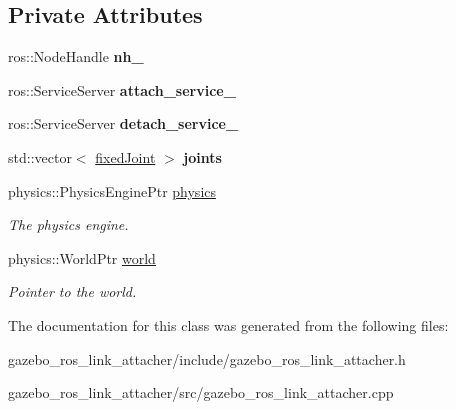 \subsection*{Private Attributes}
\begin{DoxyCompactItemize}
\item 
ros\+::\+Node\+Handle {\bfseries nh\+\_\+}\hypertarget{classgazebo_1_1GazeboRosLinkAttacher_aa9f2e548b0d54e7654f5d695465c35d8}{}\label{classgazebo_1_1GazeboRosLinkAttacher_aa9f2e548b0d54e7654f5d695465c35d8}

\item 
ros\+::\+Service\+Server {\bfseries attach\+\_\+service\+\_\+}\hypertarget{classgazebo_1_1GazeboRosLinkAttacher_a0ad42302b9f911db4c4ee4575da1b21b}{}\label{classgazebo_1_1GazeboRosLinkAttacher_a0ad42302b9f911db4c4ee4575da1b21b}

\item 
ros\+::\+Service\+Server {\bfseries detach\+\_\+service\+\_\+}\hypertarget{classgazebo_1_1GazeboRosLinkAttacher_ac367ec2e6d4586a0b0012691c1eb9b9e}{}\label{classgazebo_1_1GazeboRosLinkAttacher_ac367ec2e6d4586a0b0012691c1eb9b9e}

\item 
std\+::vector$<$ \hyperlink{structgazebo_1_1GazeboRosLinkAttacher_1_1fixedJoint}{fixed\+Joint} $>$ {\bfseries joints}\hypertarget{classgazebo_1_1GazeboRosLinkAttacher_a923603dd1f79d61db2eb00deab94b84f}{}\label{classgazebo_1_1GazeboRosLinkAttacher_a923603dd1f79d61db2eb00deab94b84f}

\item 
physics\+::\+Physics\+Engine\+Ptr \hyperlink{classgazebo_1_1GazeboRosLinkAttacher_a123418ffa0ed6705f100fe4c2ede7a03}{physics}\hypertarget{classgazebo_1_1GazeboRosLinkAttacher_a123418ffa0ed6705f100fe4c2ede7a03}{}\label{classgazebo_1_1GazeboRosLinkAttacher_a123418ffa0ed6705f100fe4c2ede7a03}

\begin{DoxyCompactList}\small\item\em The physics engine. \end{DoxyCompactList}\item 
physics\+::\+World\+Ptr \hyperlink{classgazebo_1_1GazeboRosLinkAttacher_a5f6e8a6b84a0f04ff9a39bf53ff651fe}{world}\hypertarget{classgazebo_1_1GazeboRosLinkAttacher_a5f6e8a6b84a0f04ff9a39bf53ff651fe}{}\label{classgazebo_1_1GazeboRosLinkAttacher_a5f6e8a6b84a0f04ff9a39bf53ff651fe}

\begin{DoxyCompactList}\small\item\em Pointer to the world. \end{DoxyCompactList}\end{DoxyCompactItemize}


The documentation for this class was generated from the following files\+:\begin{DoxyCompactItemize}
\item 
gazebo\+\_\+ros\+\_\+link\+\_\+attacher/include/gazebo\+\_\+ros\+\_\+link\+\_\+attacher.\+h\item 
gazebo\+\_\+ros\+\_\+link\+\_\+attacher/src/gazebo\+\_\+ros\+\_\+link\+\_\+attacher.\+cpp\end{DoxyCompactItemize}
